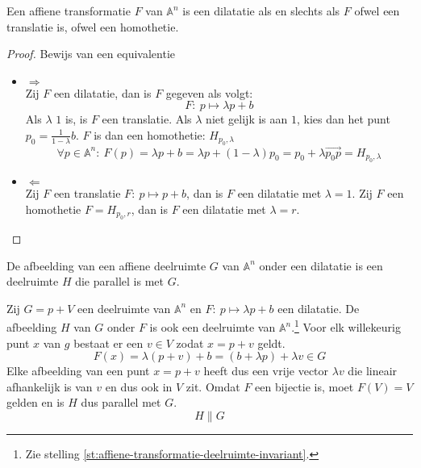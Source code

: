 \documentclass[main.tex]{subfiles}
\begin{document}
\begin{st}
  Een affiene transformatie $F$ van $\mathbb{A}^{n}$ is een dilatatie als en slechts als $F$ ofwel een translatie is, ofwel een homothetie.

  \begin{proof}
    Bewijs van een equivalentie\\
    \begin{itemize}
    \item $\Rightarrow$\\
      Zij $F$ een dilatatie, dan is $F$ gegeven als volgt:
      \[ F:\ p \mapsto \lambda p + b\]
      Als $\lambda$ $1$ is, is $F$ een translatie.
      Als $\lambda$ niet gelijk is aan $1$, kies dan het punt $p_{0} = \frac{1}{1-\lambda}b$.
      $F$ is dan een homothetie: $H_{p_{0},\lambda}$
      \[\forall p\in \mathbb{A}^{n}:\ F(p) = \lambda p + b = \lambda p + (1 - \lambda) p_{0} = p_{0} + \lambda \overrightarrow{p_{0}p} = H_{p_{0},\lambda} \]
    \item $\Leftarrow$\\
      Zij $F$ een translatie $F:\ p \mapsto p + b$, dan is $F$ een dilatatie met $\lambda = 1$.
      Zij $F$ een homothetie $F = H_{p_{0},r}$, dan is $F$ een dilatatie met $\lambda = r$.
    \end{itemize}
  \end{proof}
\end{st}

\begin{st}
  De afbeelding van een affiene deelruimte $G$ van $\mathbb{A}^{n}$ onder een dilatatie is een deelruimte $H$ die parallel is met $G$.

  \begin{st}
    Zij $G = p + V$ een deelruimte van $\mathbb{A}^{n}$ en $F:\ p \mapsto \lambda p + b$ een dilatatie.
    De afbeelding $H$ van $G$ onder $F$ is ook een deelruimte van $\mathbb{A}^{n}$.\footnote{Zie stelling \ref{st:affiene-transformatie-deelruimte-invariant}.}
    Voor elk willekeurig punt $x$ van $g$ bestaat er een $v\in V$ zodat $x = p+v$ geldt.
    \[ F(x) = \lambda(p+v) + b = (b + \lambda p) + \lambda v \in G \]
    Elke afbeelding van een punt $x= p+v$ heeft dus een vrije vector $\lambda v$ die lineair afhankelijk is van $v$ en dus ook in $V$ zit.
    Omdat $F$ een bijectie is, moet $F(V) = V$ gelden en is $H$ dus parallel met $G$.
    \[ H \parallel G \]
  \end{st}
\end{st}
\end{document}
